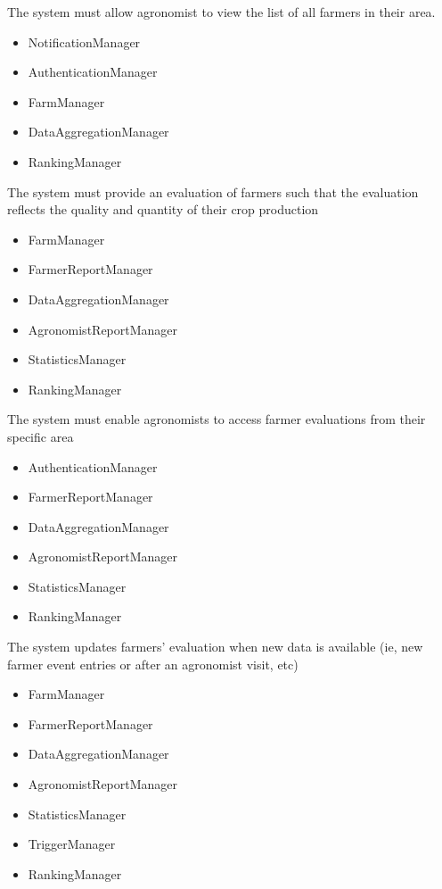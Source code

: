 \begin{itemize}
\begin{itemize}
\end{itemize}

  The system must allow agronomist to view the list of all farmers in their area.
\begin{itemize}

\item NotificationManager
\item AuthenticationManager
\item FarmManager
\item DataAggregationManager
\item RankingManager

\end{itemize}
  The system must provide an evaluation of farmers such that the evaluation reflects the quality and quantity of their crop production
\begin{itemize}


\item FarmManager
\item FarmerReportManager
\item DataAggregationManager
\item AgronomistReportManager
\item StatisticsManager
\item RankingManager


\end{itemize}
  The system must enable agronomists to access farmer evaluations from their specific area
\begin{itemize}


\item AuthenticationManager
\item FarmerReportManager
\item DataAggregationManager
\item AgronomistReportManager
\item StatisticsManager
\item RankingManager

\end{itemize}

  The system updates farmers' evaluation when new data is available (ie, new farmer event entries or after an agronomist visit, etc)
\begin{itemize}


\item FarmManager
\item FarmerReportManager
\item DataAggregationManager
\item AgronomistReportManager
\item StatisticsManager
\item TriggerManager
\item RankingManager


\end{itemize}
\end{itemize}
